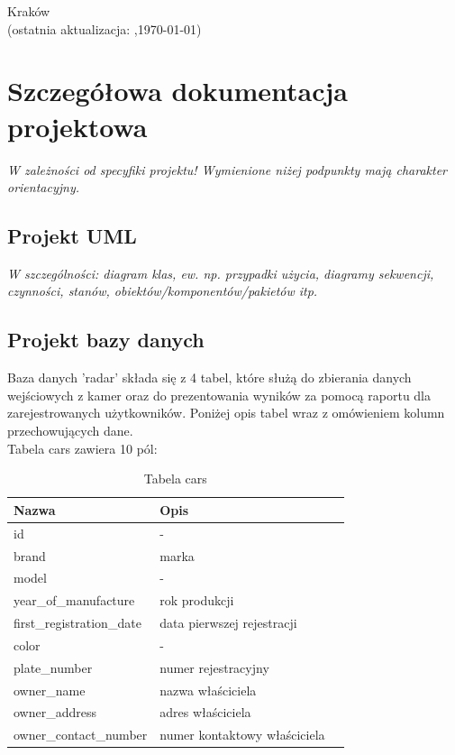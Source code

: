 \documentclass[12pt,a4paper,oneside]{article}
\theoremstyle{definition}
\numberwithin{equation}{section}
\begin{document}
\begin{titlepage}
\vspace*{\fill}
\begin{center}
\large
Kraków \the\year\\
(ostatnia aktualizacja: \DTMcurrenttime,\;\today)
\end{center}
\end{titlepage}
\setcounter{page}{0} 
\newpage\null\thispagestyle{empty}

\tableofcontents


\newpage

\section{Szczegółowa dokumentacja projektowa}
\textit{W zależności od specyfiki projektu! Wymienione niżej podpunkty mają charakter orientacyjny.}
\subsection{Projekt UML}
\textit{W szczególności: diagram klas, ew. np. przypadki użycia, diagramy sekwencji, czynności, stanów, obiektów/komponentów/pakietów itp.}
\subsection{Projekt bazy danych}
Baza danych 'radar' składa się z 4 tabel, które służą do zbierania danych wejściowych z kamer oraz do prezentowania wyników za pomocą raportu dla zarejestrowanych użytkowników. Poniżej opis tabel wraz z omówieniem kolumn przechowujących dane.\\

    Tabela cars zawiera 10 pól:
    \begin{table}[h]
    \centering
    \begin{tabularx}{\textwidth}{|X|X|X|}
    \hline
    \textbf{Nazwa} & \textbf{Opis} \\ \hline
    id &  -   \\ \hline
    brand & marka \\  \hline
    model & - \\  \hline
    year{\_}of{\_}manufacture & rok produkcji \\  \hline
    first{\_}registration{\_}date & data pierwszej rejestracji \\  \hline
    color & - \\  \hline
    plate{\_}number & numer rejestracyjny \\ \hline
    owner{\_}name & nazwa właściciela \\ \hline
    owner{\_}address & adres właściciela \\ \hline
    owner{\_}contact{\_}number & numer kontaktowy właściciela\\ \hline
    \end{tabularx}
    \caption{Tabela cars}
    \end{table}
        
\end{document}

